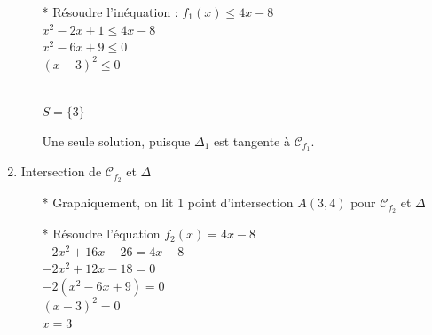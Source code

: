 \begin{enumerate}
\begin{itemize}
\item [*] Résoudre l'inéquation : $f_1(x) \leqslant 4x - 8$\\

$  x^2 -2x + 1 \leqslant 4x -8 $\\
$  x^2 -6x +9  \leqslant   0   $\\
$  (x - 3)^2   \leqslant   0   $  \\


 \\

$S = \{3\}$ 

Une seule solution, puisque  $\Delta_1$ est tangente à $\mathcal{C}_{f_1}$.

\end{itemize}

\item Intersection de $\mathcal{C}_{f_2}$ et $\Delta$ \\

\begin{itemize}
\item [*] Graphiquement, on lit 1 point d'intersection  $A(3, 4)$  pour $\mathcal{C}_{f_2}$ et $\Delta$\\ 

\item [*] Résoudre l'équation $f_2(x) = 4x - 8$\\

$  -2x^2 +16x -26 = 4x -8 $\\
$  -2x^2 +12x -18 = 0 $\\
$  -2(x^2 -6x +9) = 0 $\\
$  (x - 3)^2 = 0 $ \\
$ x = 3 $ \\


\end{itemize}
\end{enumerate}
